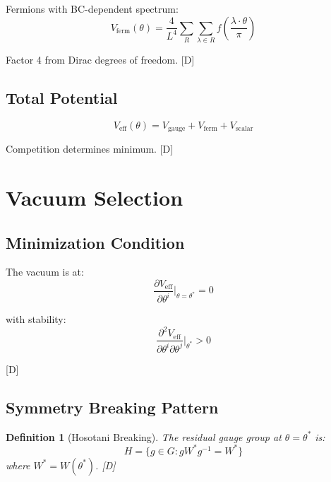 \documentclass[11pt,a4paper]{article}
\newtheorem{definition}[theorem]{Definition}
\newcommand{\tagD}{\textcolor{blue!70!black}{[D]}}
\begin{document}
Fermions with BC-dependent spectrum:
\begin{equation}
\label{eq:veff-fermion}
V_{\text{ferm}}(\theta) = \frac{4}{L^4} \sum_{R} \sum_{\lambda \in R} f\left(\frac{\lambda \cdot \theta}{\pi}\right)
\end{equation}

Factor 4 from Dirac degrees of freedom. \tagD

\subsection{Total Potential}

\begin{equation}
\label{eq:veff-total}
V_{\text{eff}}(\theta) = V_{\text{gauge}} + V_{\text{ferm}} + V_{\text{scalar}}
\end{equation}

Competition determines minimum. \tagD

\section{Vacuum Selection}

\subsection{Minimization Condition}

The vacuum is at:
\begin{equation}
\label{eq:vac-min}
\frac{\partial V_{\text{eff}}}{\partial \theta^i}\bigg|_{\theta = \theta^*} = 0
\end{equation}

with stability:
\begin{equation}
\label{eq:vac-stable}
\frac{\partial^2 V_{\text{eff}}}{\partial \theta^i \partial \theta^j}\bigg|_{\theta^*} > 0
\end{equation}

\tagD

\subsection{Symmetry Breaking Pattern}

\begin{definition}[Hosotani Breaking]
\label{def:hosotani-breaking}
The residual gauge group at $\theta = \theta^*$ is:
\begin{equation}
\label{eq:residual}
H = \{g \in G : g W^* g^{-1} = W^*\}
\end{equation}
where $W^* = W(\theta^*)$. \tagD
\end{definition}
\end{document}
